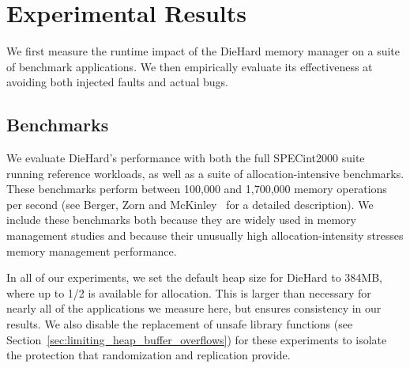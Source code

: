 \documentclass{sig-alternate}
\newcommand{\cfunction}[1]{{\bf \tt #1}}
\newcommand{\malloc}{\cfunction{malloc}}
\begin{document}
\section{Experimental Results}
\label{sec:results}

We first measure the runtime impact of the DieHard memory manager on a
suite of benchmark applications. We then empirically evaluate its
effectiveness at avoiding both injected faults and actual bugs.


\subsection{Benchmarks}

\label{sec:methodology}

We evaluate DieHard's performance with both the full SPECint2000
suite~\cite{SPEC2000} running reference workloads, as well as a suite
of allocation-intensive benchmarks. These benchmarks perform between
100,000 and 1,700,000 memory operations per second (see Berger, Zorn
and McKinley~\cite{BergerZornMcKinley:2001} for a detailed
description). We include these benchmarks both because they are widely
used in memory management studies \cite{berg00,grun93,john97} and
because their unusually high allocation-intensity stresses memory
management performance.

In all of our experiments, we set the default heap size for DieHard to
384MB, where up to 1/2 is available for allocation. This is larger
than necessary for nearly all of the applications we measure here, but
ensures consistency in our results. We also disable the replacement
of unsafe library functions (see
Section~\ref{sec:limiting_heap_buffer_overflows}) for these
experiments to isolate the protection that randomization and
replication provide.
\end{document}
